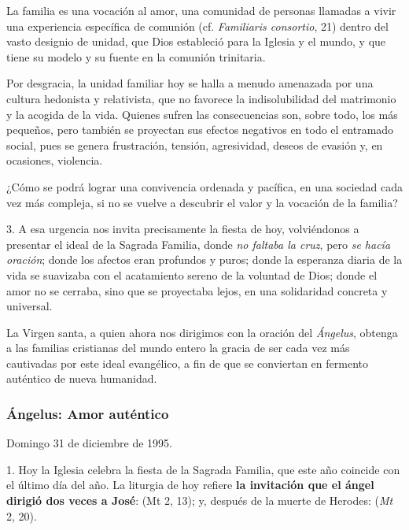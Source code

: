 \begin{body}
\begin{body}
La familia es una vocación al amor, una comunidad de personas llamadas a vivir una experiencia específica de comunión (cf. \emph{Familiaris consortio}, 21) dentro del vasto designio de unidad, que Dios estableció para la Iglesia y el mundo, y que tiene su modelo y su fuente en la comunión trinitaria.

Por desgracia, la unidad familiar hoy se halla a menudo amenazada por una cultura hedonista y relativista, que no favorece la indisolubilidad del matrimonio y la acogida de la vida. Quienes sufren las consecuencias son, sobre todo, los más pequeños, pero también se proyectan sus efectos negativos en todo el entramado social, pues se genera frustración, tensión, agresividad, deseos de evasión y, en ocasiones, violencia.

¿Cómo se podrá lograr una convivencia ordenada y pacífica, en una sociedad cada vez más compleja, si no se vuelve a descubrir el valor y la vocación de la familia?

3. A esa urgencia nos invita precisamente la fiesta de hoy, volviéndonos a presentar el ideal de la Sagrada Familia, donde \emph{no faltaba la cruz}, pero \emph{se hacía oración}; donde los afectos eran profundos y puros; donde la esperanza diaria de la vida se suavizaba con el acatamiento sereno de la voluntad de Dios; donde el amor no se cerraba, sino que se proyectaba lejos, en una solidaridad concreta y universal.

La Virgen santa, a quien ahora nos dirigimos con la oración del \emph{Ángelus}, obtenga a las familias cristianas del mundo entero la gracia de ser cada vez más cautivadas por este ideal evangélico, a fin de que se conviertan en fermento auténtico de nueva humanidad.

\subsubsection{Ángelus: Amor auténtico}

Domingo 31 de diciembre de 1995.

1. Hoy la Iglesia celebra la fiesta de la Sagrada Familia, que este año coincide con el último día del año. La liturgia de hoy refiere \textbf{la invitación que el ángel dirigió dos veces a José}:  (Mt 2, 13); y, después de la muerte de Herodes:  (\emph{Mt} 2, 20).


\end{body}
\end{body}
